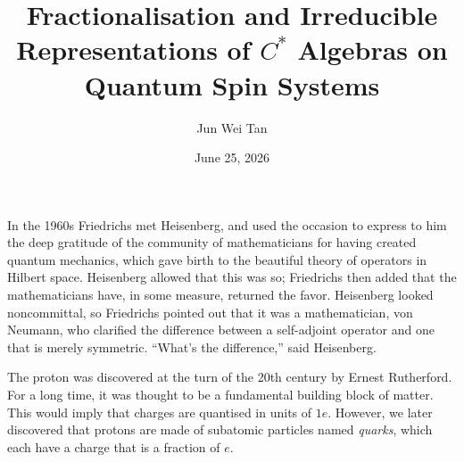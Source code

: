 \documentclass[prb,11pt, nofootinbib]{revtex4-2}
\theoremstyle{definition}
\theoremstyle{definition}
\theoremstyle{definition}
\theoremstyle{definition}
\begin{document}
\title{Fractionalisation and Irreducible Representations of $C^*$ Algebras on Quantum Spin Systems}
	\author{Jun Wei Tan}
	\date{June 25, 2026}
	\maketitle
	\begin{tcolorbox}
		In the 1960s Friedrichs met Heisenberg, and used the occasion to express to him the deep gratitude of the community of mathematicians for having created quantum mechanics, which gave birth to the beautiful theory of operators in Hilbert space. Heisenberg allowed that this was so; Friedrichs then added that the mathematicians have, in some measure, returned the favor. Heisenberg looked noncommittal, so Friedrichs pointed out that it was a mathematician, von Neumann, who clarified the difference between a self-adjoint operator and one that is merely symmetric. ``What's the difference,'' said Heisenberg. \cite{lax2014functional}
	\end{tcolorbox}


	The proton was discovered at the turn of the 20th century by Ernest Rutherford. For a long time, it was thought to be a fundamental building block of matter. This would imply that charges are quantised in units of $1e$. However, we later discovered that protons are made of subatomic particles named \emph{quarks}, which each have a charge that is a fraction of $e$. 
\end{document}
